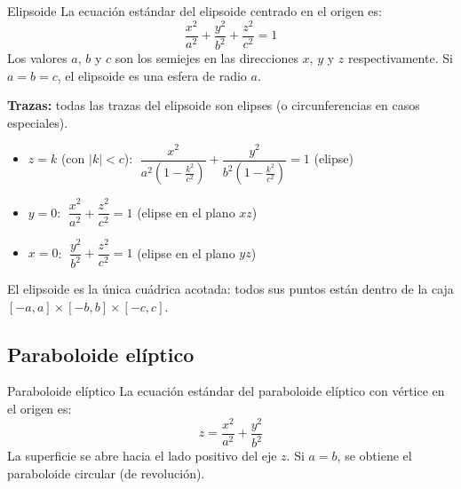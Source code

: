 \begin{mydefinition}{Elipsoide}
La ecuación estándar del elipsoide centrado en el origen es:
\[
\frac{x^2}{a^2} + \frac{y^2}{b^2} + \frac{z^2}{c^2} = 1
\]
Los valores $a$, $b$ y $c$ son los semiejes en las direcciones $x$, $y$ y $z$ respectivamente. Si $a = b = c$, el elipsoide es una esfera de radio $a$.
\end{mydefinition}

\textbf{Trazas:} todas las trazas del elipsoide son elipses (o circunferencias en casos especiales).
\begin{itemize}
    \item $z = k$ (con $|k| < c$): $\;\dfrac{x^2}{a^2\left(1-\frac{k^2}{c^2}\right)} + \dfrac{y^2}{b^2\left(1-\frac{k^2}{c^2}\right)} = 1$ \quad (elipse)
    \item $y = 0$: $\;\dfrac{x^2}{a^2} + \dfrac{z^2}{c^2} = 1$ \quad (elipse en el plano $xz$)
    \item $x = 0$: $\;\dfrac{y^2}{b^2} + \dfrac{z^2}{c^2} = 1$ \quad (elipse en el plano $yz$)
\end{itemize}

El elipsoide es la única cuádrica acotada: todos sus puntos están dentro de la caja $[-a,a]\times[-b,b]\times[-c,c]$.

\begin{center}
\end{center}

\subsection{Paraboloide elíptico}

\begin{mydefinition}{Paraboloide elíptico}
La ecuación estándar del paraboloide elíptico con vértice en el origen es:
\[
z = \frac{x^2}{a^2} + \frac{y^2}{b^2}
\]
La superficie se abre hacia el lado positivo del eje $z$. Si $a = b$, se obtiene el paraboloide circular (de revolución).
\end{mydefinition}

